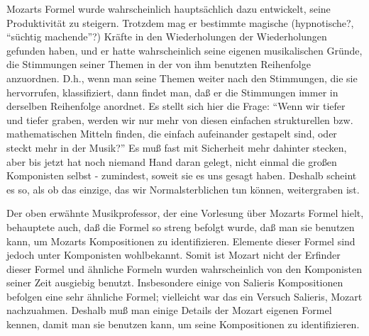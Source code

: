 Mozarts Formel wurde wahrscheinlich hauptsächlich dazu entwickelt, seine Produktivität zu steigern.
Trotzdem mag er bestimmte magische (hypnotische?, \enquote{süchtig machende}?) Kräfte in den Wiederholungen der Wiederholungen gefunden haben, und er hatte wahrscheinlich seine eigenen musikalischen Gründe, die Stimmungen seiner Themen in der von ihm benutzten Reihenfolge anzuordnen.
D.h., wenn man seine Themen weiter nach den Stimmungen, die sie hervorrufen, klassifiziert, dann findet man, daß er die Stimmungen immer in derselben Reihenfolge anordnet.
Es stellt sich hier die Frage: \enquote{Wenn wir tiefer und tiefer graben, werden wir nur mehr von diesen einfachen strukturellen bzw. mathematischen Mitteln finden, die einfach aufeinander gestapelt sind, oder steckt mehr in der Musik?}
Es muß fast mit Sicherheit mehr dahinter stecken, aber bis jetzt hat noch niemand Hand daran gelegt, nicht einmal die großen Komponisten selbst - zumindest, soweit sie es uns gesagt haben.
Deshalb scheint es so, als ob das einzige, das wir Normalsterblichen tun können, weitergraben ist.

Der oben erwähnte Musikprofessor, der eine Vorlesung über Mozarts Formel hielt, behauptete auch, daß die Formel so streng befolgt wurde, daß man sie benutzen kann, um Mozarts Kompositionen zu identifizieren.
Elemente dieser Formel sind jedoch unter Komponisten wohlbekannt.
Somit ist Mozart nicht der Erfinder dieser Formel und ähnliche Formeln wurden wahrscheinlich von den Komponisten seiner Zeit ausgiebig benutzt.
Insbesondere einige von Salieris Kompositionen befolgen eine sehr ähnliche Formel; vielleicht war das ein Versuch Salieris, Mozart nachzuahmen.
Deshalb muß man einige Details der Mozart eigenen Formel kennen, damit man sie benutzen kann, um seine Kompositionen zu identifizieren.

